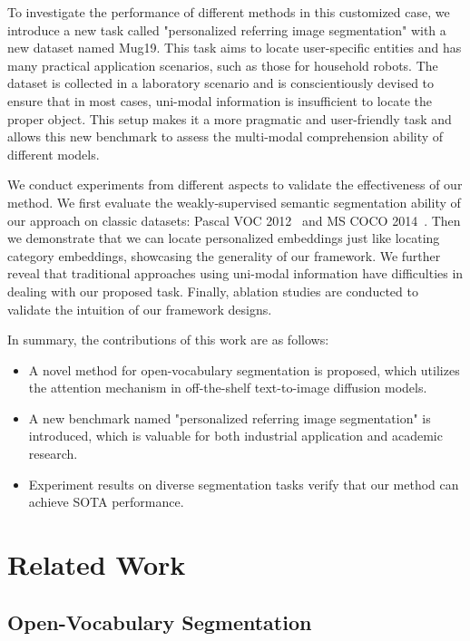 \documentclass[letterpaper]{article} \usepackage[submission]{aaai24}  \usepackage{times}  \usepackage{helvet}  \usepackage{courier}  \usepackage[hyphens]{url}  \usepackage{graphicx} \urlstyle{rm} \def\UrlFont{\rm}  \usepackage{natbib}  \usepackage{caption} \frenchspacing  \setlength{\pdfpagewidth}{8.5in} \setlength{\pdfpageheight}{11in} \usepackage{algorithm}
\begin{document}
To investigate the performance of different methods in this customized case, we introduce a new task called "personalized referring image segmentation" with a new dataset named Mug19.
This task aims to locate user-specific entities and has many practical application scenarios, such as those for household robots.
The dataset is collected in a laboratory scenario and is conscientiously devised to ensure that in most cases, uni-modal information is insufficient to locate the proper object.
This setup makes it a more pragmatic and user-friendly task and allows this new benchmark to assess the multi-modal comprehension ability of different models.

We conduct experiments from different aspects to validate the effectiveness of our method.
We first evaluate the weakly-supervised semantic segmentation ability of our approach on classic datasets: Pascal VOC 2012~\cite{pascalvoc} and MS COCO 2014~\cite{mscoco}.
Then we demonstrate that we can locate personalized embeddings just like locating category embeddings, showcasing the generality of our framework.
We further reveal that traditional approaches using uni-modal information have difficulties in dealing with our proposed task.
Finally, ablation studies are conducted to validate the intuition of our framework designs.

In summary, the contributions of this work are as follows:
\begin{itemize}
    \item A novel method for open-vocabulary segmentation is proposed, which utilizes the attention mechanism in off-the-shelf text-to-image diffusion models.
    \item A new benchmark named "personalized referring image segmentation" is introduced, which is valuable for both industrial application and academic research.
    \item Experiment results on diverse segmentation tasks verify that our method can achieve SOTA performance.
\end{itemize}

\section{Related Work}
\label{sec:related}

\subsection{Open-Vocabulary Segmentation}
\label{sec:openvoc}
\end{document}
